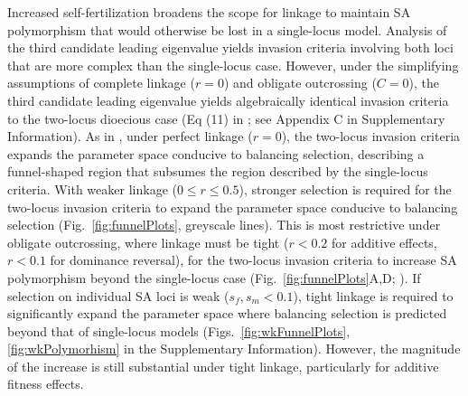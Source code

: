 \documentclass{article}
\begin{document}
Increased self-fertilization broadens the scope for linkage to maintain SA polymorphism that would otherwise be lost in a single-locus model. Analysis of the third candidate leading eigenvalue yields invasion criteria involving both loci that are more complex than the single-locus case. However, under the simplifying assumptions of complete linkage ($r=0$) and obligate outcrossing ($C=0$), the third candidate leading eigenvalue yields algebraically identical invasion criteria to the two-locus dioecious case (Eq (11) in \citealt{Patten2010}; see Appendix C in Supplementary Information). As in \citet{Patten2010}, under perfect linkage ($r=0$), the two-locus invasion criteria expands the parameter space conducive to balancing selection, describing a funnel-shaped region that subsumes the region described by the single-locus criteria. With weaker linkage ($0 \leq r \leq 0.5$), stronger selection is required for the two-locus invasion criteria to expand the parameter space conducive to balancing selection (Fig.~\ref{fig:funnelPlots}, greyscale lines). This is most restrictive under obligate outcrossing, where linkage must be tight ($r < 0.2$ for additive effects, $r < 0.1$ for dominance reversal), for the two-locus invasion criteria to increase SA polymorphism beyond the single-locus case (Fig.~\ref{fig:funnelPlots}A,D; \citealt{Patten2010}). If selection on individual SA loci is weak ($s_f,s_m < 0.1$), tight linkage is required to significantly expand the parameter space where balancing selection is predicted beyond that of single-locus models (Figs.~\ref{fig:wkFunnelPlots}, \ref{fig:wkPolymorhism} in the Supplementary Information). However, the magnitude of the increase is still substantial under tight linkage, particularly for additive fitness effects.
\end{document}

